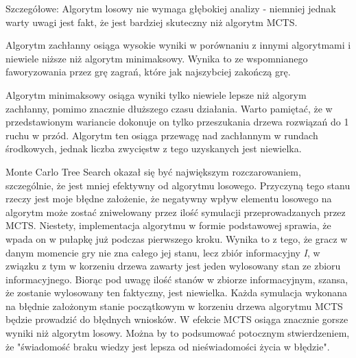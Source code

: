 Szczegółowe:
Algorytm losowy nie wymaga głębokiej analizy - niemniej jednak warty uwagi jest fakt, że jest bardziej skuteczny niż algorytm MCTS.

Algorytm zachłanny osiąga wysokie wyniki w porównaniu z innymi algorytmami i niewiele niższe niż algorytm minimaksowy. Wynika to ze wspomnianego faworyzowania przez grę zagrań, które jak najszybciej zakończą grę. 

Algorytm minimaksowy osiąga wyniki tylko niewiele lepsze niż algorym zachłanny, pomimo znacznie dłuższego czasu działania. Warto pamiętać, że w przedstawionym wariancie dokonuje on tylko przeszukania drzewa rozwiązań do 1 ruchu w przód. Algorytm ten osiąga przewagę nad zachłannym w rundach środkowych, jednak liczba zwycięstw z tego uzyskanych jest niewielka.

Monte Carlo Tree Search okazał się być największym rozczarowaniem, szczególnie, że jest mniej efektywny od algorytmu losowego. Przyczyną tego stanu rzeczy jest moje błędne założenie, że negatywny wpływ elementu losowego na algorytm może zostać zniwelowany przez ilość symulacji przeprowadzanych przez MCTS. Niestety, implementacja algorytmu w formie podstawowej sprawia, że wpada on w pułapkę już podczas pierwszego kroku. Wynika to z tego, że gracz w danym momencie gry nie zna całego jej stanu, lecz zbiór informacyjny \textit{I}, w związku z tym w korzeniu drzewa zawarty jest jeden wylosowany stan ze zbioru informacyjnego. Biorąc pod uwagę ilość stanów w zbiorze informacyjnym, szansa, że zostanie wylosowany ten faktyczny, jest niewielka. Każda symulacja wykonana na błędnie założonym stanie początkowym w korzeniu drzewa algorytmu MCTS będzie prowadzić do błędnych wniosków. W efekcie MCTS osiąga znacznie gorsze wyniki niż algorytm losowy. Można by to podsumować potocznym stwierdzeniem, że "świadomość braku wiedzy jest lepsza od nieświadomości życia w błędzie". 